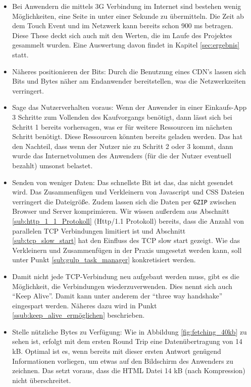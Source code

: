 \begin{itemize}
			\item Bei Anwendern die mittels 3G Verbindung im Internet sind bestehen wenig Möglichkeiten, eine Seite in unter einer Sekunde zu übermitteln. Die Zeit ab dem Touch Event und im Netzwerk kann bereits schon 900 ms betragen. Diese These deckt sich auch mit den Werten, die im Laufe des Projektes gesammelt wurden. Eine Auswertung davon findet in Kapitel \ref{sec:ergebnis} statt.

			\item Näheres positionieren der Bits: Durch die Benutzung eines CDN's lassen sich Bits und Bytes näher am Endanwender bereitstellen, was die Netzwerkzeiten verringert.

			\item Sage das Nutzerverhalten voraus: Wenn der Anwender in einer Einkaufs-App 3 Schritte zum Vollenden des Kaufvorgangs benötigt, dann lässt sich bei Schritt 1 bereits vorhersagen, was er für weitere Ressourcen im nächsten Schritt benötigt. Diese Ressourcen könnten bereits geladen werden. Das hat den Nachteil, dass wenn der Nutzer nie zu Schritt 2 oder 3 kommt, dann wurde das Internetvolumen des Anwenders (für die der Nutzer eventuell bezahlt) umsonst belastet.

			\item Senden von weniger Daten: Das schnellste Bit ist das, das nicht gesendet wird. Das Zusammenfügen und Verkleinern von Javascript und CSS Dateien verringert die Dateigröße. Zudem lassen sich die Daten per \texttt{GZIP} zwischen Browser und Server komprimieren. Wir wissen außerdem aus Abschnitt \ref{sub:http_1_1_Protokoll} (Http/1.1 Protokoll) bereits, dass die Anzahl von parallelen TCP Verbindungen limitiert ist und Abschnitt \ref{sub:tcp_slow_start} hat den Einfluss des TCP slow start gezeigt. Wie das Verkleinern und Zusammenfügen in der Praxis umgesetzt werden kann, soll unter Punkt \ref{sub:gulp_task_manager} konkretisiert werden.

			\item Damit nicht jede TCP-Verbindung neu aufgebaut werden muss, gibt es die Möglichkeit, die Verbindungen wiederzuverwenden. Dies nennt sich auch "`Keep Alive"'. Damit kann unter anderem der "`three way handshake"' eingespart werden. Näheres dazu wird in Punkt \ref{ssub:keep_alive_ermöglichen} beschrieben.

			\item Stelle nützliche Bytes zu Verfügung: Wie in Abbildung \ref{fig:fetching_40kb} zu sehen ist, erfolgt mit dem ersten Round Trip eine Datenübertragung von  14 kB. Optimal ist es, wenn bereits mit dieser ersten Antwort genügend Informationen vorliegen, um etwas auf den Bildschirm des Anwenders zu zeichnen. Das setzt voraus, dass die HTML Datei 14 kB (nach Kompression) nicht überschreitet.

		\end{itemize}

